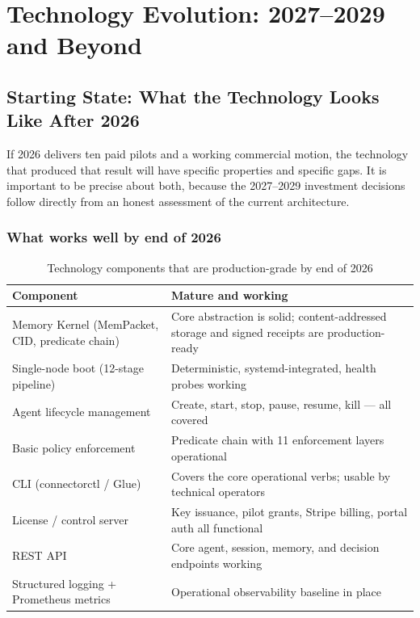 \chapter{Technology Evolution: 2027--2029 and Beyond}

\section{Starting State: What the Technology Looks Like After 2026}

If 2026 delivers ten paid pilots and a working commercial motion, the technology
that produced that result will have specific properties and specific gaps. It
is important to be precise about both, because the 2027--2029 investment
decisions follow directly from an honest assessment of the current architecture.

\subsection{What works well by end of 2026}

\begin{table}[H]
\centering
\renewcommand{\arraystretch}{1.45}
\begin{tabularx}{\textwidth}{@{}lX@{}}
\toprule
\textbf{Component} & \textbf{Mature and working} \\
\midrule
Memory Kernel (MemPacket, CID, predicate chain) & Core abstraction is solid; content-addressed storage and signed receipts are production-ready \\
Single-node boot (12-stage pipeline) & Deterministic, systemd-integrated, health probes working \\
Agent lifecycle management & Create, start, stop, pause, resume, kill — all covered \\
Basic policy enforcement & Predicate chain with 11 enforcement layers operational \\
CLI (connectorctl / Glue) & Covers the core operational verbs; usable by technical operators \\
License / control server & Key issuance, pilot grants, Stripe billing, portal auth all functional \\
REST API & Core agent, session, memory, and decision endpoints working \\
Structured logging + Prometheus metrics & Operational observability baseline in place \\
\bottomrule
\end{tabularx}
\caption{Technology components that are production-grade by end of 2026}
\end{table}

